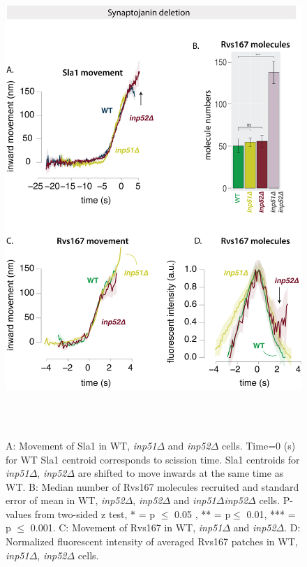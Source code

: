 \vspace{3mm}
\begin{figure}[H]
	\centering
	\includegraphics[width=18cm,height=18cm,keepaspectratio]{figures/results_final/inp_movement3}
	\caption[Effect of synaptojanin deletion]
	{A: Movement of Sla1 in WT, \textit{inp51$\Delta$} and \textit{inp52$\Delta$} cells. Time=0 (s) for WT Sla1 centroid corresponds to scission time. Sla1 centroids for \textit{inp51$\Delta$}, \textit{inp52$\Delta$}  are shifted to move inwards at the same time as WT. 
		B: Median number of Rvs167 molecules recruited and standard error of mean in WT, \textit{inp52$\Delta$}, \textit{inp52$\Delta$} and \textit{inp51$\Delta$inp52$\Delta$} cells. P-values from two-sided z test,  * = p $\leq$ 0.05 , ** = p$\leq$ 0.01, *** = p $\leq$ 0.001.  
		C: Movement of Rvs167 in WT, \textit{inp51$\Delta$} and \textit{inp52$\Delta$}. 
		D: Normalized fluorescent intensity of averaged Rvs167 patches in WT, \textit{inp51$\Delta$}, \textit{inp52$\Delta$ } cells.
		\label{fig_inpmov}}
\end{figure}


